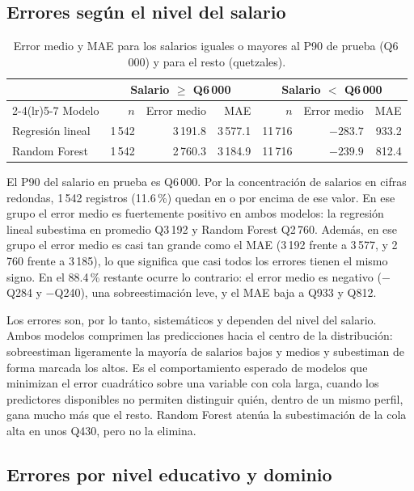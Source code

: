 \documentclass[11pt,a4paper]{article}
\begin{document}
\subsection{Errores según el nivel del salario}

\begin{table}[H]
\centering
\caption{Error medio y MAE para los salarios iguales o mayores al P90 de prueba (Q6\,000) y para el resto (quetzales).}
\label{tab:percentil}
\small
\begin{tabular}{lrrrrrr}
\toprule
 & \multicolumn{3}{c}{Salario $\geq$ Q6\,000} & \multicolumn{3}{c}{Salario $<$ Q6\,000} \\
\cmidrule(lr){2-4}\cmidrule(lr){5-7}
Modelo & $n$ & Error medio & MAE & $n$ & Error medio & MAE \\
\midrule
Regresión lineal & 1\,542 & 3\,191.8 & 3\,577.1 & 11\,716 & $-283.7$ & 933.2 \\
Random Forest & 1\,542 & 2\,760.3 & 3\,184.9 & 11\,716 & $-239.9$ & 812.4 \\
\bottomrule
\end{tabular}
\end{table}

El P90 del salario en prueba es Q6\,000. Por la concentración de salarios en cifras redondas, 1\,542 registros (11.6\,\%) quedan en o por encima de ese valor. En ese grupo el error medio es fuertemente positivo en ambos modelos: la regresión lineal subestima en promedio Q3\,192 y Random Forest Q2\,760. Además, en ese grupo el error medio es casi tan grande como el MAE (3\,192 frente a 3\,577, y 2\,760 frente a 3\,185), lo que significa que casi todos los errores tienen el mismo signo. En el 88.4\,\% restante ocurre lo contrario: el error medio es negativo ($-$Q284 y $-$Q240), una sobreestimación leve, y el MAE baja a Q933 y Q812.

Los errores son, por lo tanto, sistemáticos y dependen del nivel del salario. Ambos modelos comprimen las predicciones hacia el centro de la distribución: sobreestiman ligeramente la mayoría de salarios bajos y medios y subestiman de forma marcada los altos. Es el comportamiento esperado de modelos que minimizan el error cuadrático sobre una variable con cola larga, cuando los predictores disponibles no permiten distinguir quién, dentro de un mismo perfil, gana mucho más que el resto. Random Forest atenúa la subestimación de la cola alta en unos Q430, pero no la elimina.

\subsection{Errores por nivel educativo y dominio}
\end{document}
